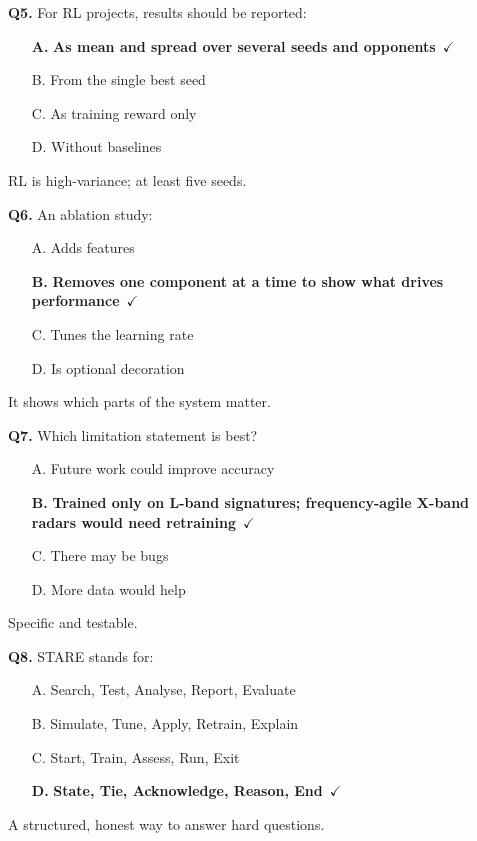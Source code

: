 \documentclass[11pt]{article}
\begin{document}
{\noindent\textbf{Q5.} For RL projects, results should be reported:\begin{itemize}[leftmargin=2.2em,itemsep=0pt,topsep=1pt]\item[\textbf{A.}] \textbf{As mean and spread over several seeds and opponents}~{\color{GrnN}$\checkmark$}\item[B.] From the single best seed\item[C.] As training reward only\item[D.] Without baselines\end{itemize} RL is high-variance; at least five seeds.\par\medskip

\noindent\textbf{Q6.} An ablation study:\begin{itemize}[leftmargin=2.2em,itemsep=0pt,topsep=1pt]\item[A.] Adds features\item[\textbf{B.}] \textbf{Removes one component at a time to show what drives performance}~{\color{GrnN}$\checkmark$}\item[C.] Tunes the learning rate\item[D.] Is optional decoration\end{itemize} It shows which parts of the system matter.\par\medskip

\noindent\textbf{Q7.} Which limitation statement is best?\begin{itemize}[leftmargin=2.2em,itemsep=0pt,topsep=1pt]\item[A.] Future work could improve accuracy\item[\textbf{B.}] \textbf{Trained only on L-band signatures; frequency-agile X-band radars would need retraining}~{\color{GrnN}$\checkmark$}\item[C.] There may be bugs\item[D.] More data would help\end{itemize} Specific and testable.\par\medskip

\noindent\textbf{Q8.} STARE stands for:\begin{itemize}[leftmargin=2.2em,itemsep=0pt,topsep=1pt]\item[A.] Search, Test, Analyse, Report, Evaluate\item[B.] Simulate, Tune, Apply, Retrain, Explain\item[C.] Start, Train, Assess, Run, Exit\item[\textbf{D.}] \textbf{State, Tie, Acknowledge, Reason, End}~{\color{GrnN}$\checkmark$}\end{itemize} A structured, honest way to answer hard questions.\par\medskip

}
\end{document}
